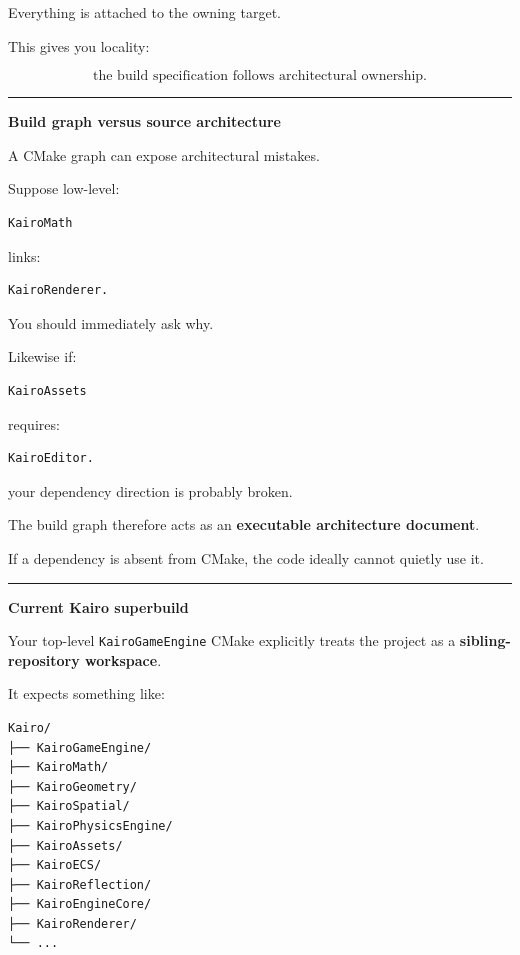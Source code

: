 Everything is attached to the owning target.

This gives you locality:

\[
\boxed{
\text{the build specification follows architectural ownership}.
}
\]

\begin{center}\rule{0.5\linewidth}{0.5pt}\end{center}

\textbf{Build graph versus source architecture}

A CMake graph can expose architectural mistakes.

Suppose low-level:

\begin{verbatim}
KairoMath
\end{verbatim}

links:

\begin{verbatim}
KairoRenderer.
\end{verbatim}

You should immediately ask why.

Likewise if:

\begin{verbatim}
KairoAssets
\end{verbatim}

requires:

\begin{verbatim}
KairoEditor.
\end{verbatim}

your dependency direction is probably broken.

The build graph therefore acts as an \textbf{executable architecture document}.

If a dependency is absent from CMake, the code ideally cannot quietly use it.

\begin{center}\rule{0.5\linewidth}{0.5pt}\end{center}

\textbf{Current Kairo superbuild}

Your top-level \texttt{KairoGameEngine} CMake explicitly treats the project as a \textbf{sibling-repository workspace}.

It expects something like:

\begin{verbatim}
Kairo/
├── KairoGameEngine/
├── KairoMath/
├── KairoGeometry/
├── KairoSpatial/
├── KairoPhysicsEngine/
├── KairoAssets/
├── KairoECS/
├── KairoReflection/
├── KairoEngineCore/
├── KairoRenderer/
└── ...
\end{verbatim}


